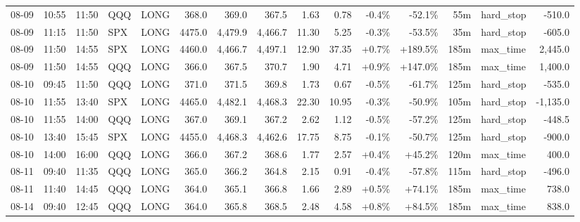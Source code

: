 \documentclass[11pt,a4paper,twoside]{article}
\begin{document}
\begin{landscape}
\begin{center}
\begin{longtable}{>{\color{txtmain}}l l l l l r r r r r r r r >{\color{txtmain}}l r}
08-09 & 10:55 & 11:50 & QQQ & LONG & 368.0 & 369.0 & 367.5 & 1.63 & 0.78 & \textcolor{lossred}{-0.4\%} & \textcolor{lossred}{-52.1\%} & 55m & hard\_stop & \textcolor{lossred}{-510.0} \\
08-09 & 11:15 & 11:50 & SPX & LONG & 4475.0 & 4,479.9 & 4,466.7 & 11.30 & 5.25 & \textcolor{lossred}{-0.3\%} & \textcolor{lossred}{-53.5\%} & 35m & hard\_stop & \textcolor{lossred}{-605.0} \\
08-09 & 11:50 & 14:55 & SPX & LONG & 4460.0 & 4,466.7 & 4,497.1 & 12.90 & 37.35 & \textcolor{wingreen}{+0.7\%} & \textcolor{wingreen}{+189.5\%} & 185m & max\_time & \textcolor{wingreen}{2,445.0} \\
08-09 & 11:50 & 14:55 & QQQ & LONG & 366.0 & 367.5 & 370.7 & 1.90 & 4.71 & \textcolor{wingreen}{+0.9\%} & \textcolor{wingreen}{+147.0\%} & 185m & max\_time & \textcolor{wingreen}{1,400.0} \\
08-10 & 09:45 & 11:50 & QQQ & LONG & 371.0 & 371.5 & 369.8 & 1.73 & 0.67 & \textcolor{lossred}{-0.5\%} & \textcolor{lossred}{-61.7\%} & 125m & hard\_stop & \textcolor{lossred}{-535.0} \\
08-10 & 11:55 & 13:40 & SPX & LONG & 4465.0 & 4,482.1 & 4,468.3 & 22.30 & 10.95 & \textcolor{lossred}{-0.3\%} & \textcolor{lossred}{-50.9\%} & 105m & hard\_stop & \textcolor{lossred}{-1,135.0} \\
08-10 & 11:55 & 14:00 & QQQ & LONG & 367.0 & 369.1 & 367.2 & 2.62 & 1.12 & \textcolor{lossred}{-0.5\%} & \textcolor{lossred}{-57.2\%} & 125m & hard\_stop & \textcolor{lossred}{-448.5} \\
08-10 & 13:40 & 15:45 & SPX & LONG & 4455.0 & 4,468.3 & 4,462.6 & 17.75 & 8.75 & \textcolor{lossred}{-0.1\%} & \textcolor{lossred}{-50.7\%} & 125m & hard\_stop & \textcolor{lossred}{-900.0} \\
08-10 & 14:00 & 16:00 & QQQ & LONG & 366.0 & 367.2 & 368.6 & 1.77 & 2.57 & \textcolor{wingreen}{+0.4\%} & \textcolor{wingreen}{+45.2\%} & 120m & max\_time & \textcolor{wingreen}{400.0} \\
08-11 & 09:40 & 11:35 & QQQ & LONG & 365.0 & 366.2 & 364.8 & 2.15 & 0.91 & \textcolor{lossred}{-0.4\%} & \textcolor{lossred}{-57.8\%} & 115m & hard\_stop & \textcolor{lossred}{-496.0} \\
08-11 & 11:40 & 14:45 & QQQ & LONG & 364.0 & 365.1 & 366.8 & 1.66 & 2.89 & \textcolor{wingreen}{+0.5\%} & \textcolor{wingreen}{+74.1\%} & 185m & max\_time & \textcolor{wingreen}{738.0} \\
08-14 & 09:40 & 12:45 & QQQ & LONG & 364.0 & 365.8 & 368.5 & 2.48 & 4.58 & \textcolor{wingreen}{+0.8\%} & \textcolor{wingreen}{+84.5\%} & 185m & max\_time & \textcolor{wingreen}{838.0} \\

\end{longtable}
\end{center}
\end{landscape}
\end{document}
